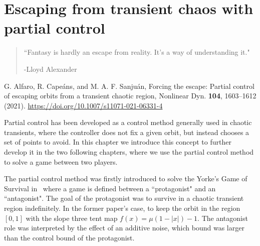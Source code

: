 \chapter{Escaping from transient chaos with partial control} %
\label{chap:ForcingEscape}


\begin{quotation}
	\vspace{-3cm}
    \begin{flushright}
    \begin{minipage}[t][5cm][b]{0.5\textwidth}
    { ``Fantasy is hardly an escape from reality. It's a way of understanding it."}
    
    \bigskip
    
    -{\small  Lloyd Alexander}
    \end{minipage}
    \end{flushright}
    
    \vspace{0.5cm}
\end{quotation}



\vspace{0.5cm}

G. Alfaro, R. Capeáns, and M. A. F. Sanjuán,
Forcing the escape: Partial control of escaping orbits from a
transient chaotic region,
Nonlinear Dyn. \textbf{104}, 1603--1612 (2021).
\url{https://doi.org/10.1007/s11071-021-06331-4}

\vspace{1cm}



Partial control has been developed as a control method generally used in chaotic transients, where the controller does not fix a given orbit, but instead chooses a set of points to avoid. In this chapter we introduce this concept to further develop it in the two following chapters, where we use the partial control method to solve a game between two players. 

The partial control method was firstly introduced to solve the Yorke's Game of Survival in~\cite{Yorke'sGame} where a game is defined between a ``protagonist" and an ``antagonist". The goal of the protagonist was to survive in a chaotic transient region indefinitely. In the former paper's case, to keep the orbit in the region $[0,1]$ with the slope three tent map $f(x) = \mu(1-|x|)-1$. The antagonist role was interpreted by the effect of an additive noise, which bound was larger than the control bound of the protagonist.

